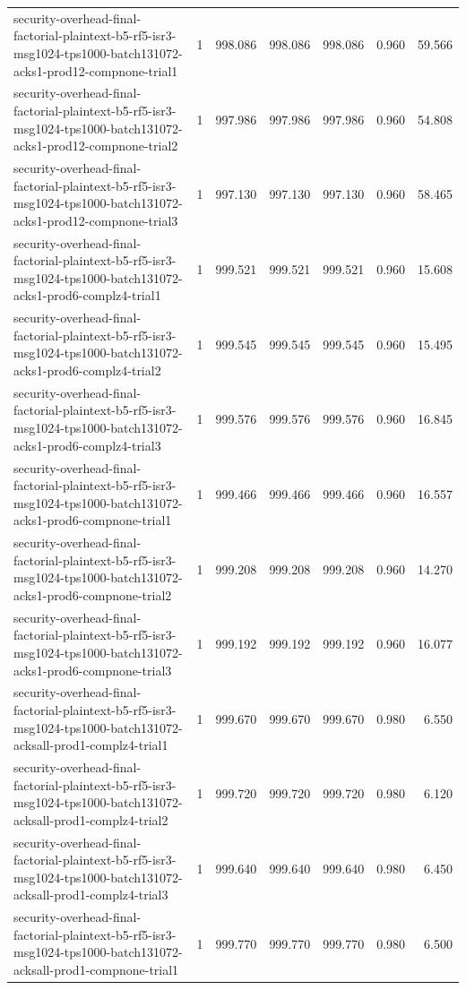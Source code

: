 \begin{tabular}{lrrrrrr}
security-overhead-final-factorial-plaintext-b5-rf5-isr3-msg1024-tps1000-batch131072-acks1-prod12-compnone-trial1 & 1 & 998.086 & 998.086 & 998.086 & 0.960 & 59.566 \\
security-overhead-final-factorial-plaintext-b5-rf5-isr3-msg1024-tps1000-batch131072-acks1-prod12-compnone-trial2 & 1 & 997.986 & 997.986 & 997.986 & 0.960 & 54.808 \\
security-overhead-final-factorial-plaintext-b5-rf5-isr3-msg1024-tps1000-batch131072-acks1-prod12-compnone-trial3 & 1 & 997.130 & 997.130 & 997.130 & 0.960 & 58.465 \\
security-overhead-final-factorial-plaintext-b5-rf5-isr3-msg1024-tps1000-batch131072-acks1-prod6-complz4-trial1 & 1 & 999.521 & 999.521 & 999.521 & 0.960 & 15.608 \\
security-overhead-final-factorial-plaintext-b5-rf5-isr3-msg1024-tps1000-batch131072-acks1-prod6-complz4-trial2 & 1 & 999.545 & 999.545 & 999.545 & 0.960 & 15.495 \\
security-overhead-final-factorial-plaintext-b5-rf5-isr3-msg1024-tps1000-batch131072-acks1-prod6-complz4-trial3 & 1 & 999.576 & 999.576 & 999.576 & 0.960 & 16.845 \\
security-overhead-final-factorial-plaintext-b5-rf5-isr3-msg1024-tps1000-batch131072-acks1-prod6-compnone-trial1 & 1 & 999.466 & 999.466 & 999.466 & 0.960 & 16.557 \\
security-overhead-final-factorial-plaintext-b5-rf5-isr3-msg1024-tps1000-batch131072-acks1-prod6-compnone-trial2 & 1 & 999.208 & 999.208 & 999.208 & 0.960 & 14.270 \\
security-overhead-final-factorial-plaintext-b5-rf5-isr3-msg1024-tps1000-batch131072-acks1-prod6-compnone-trial3 & 1 & 999.192 & 999.192 & 999.192 & 0.960 & 16.077 \\
security-overhead-final-factorial-plaintext-b5-rf5-isr3-msg1024-tps1000-batch131072-acksall-prod1-complz4-trial1 & 1 & 999.670 & 999.670 & 999.670 & 0.980 & 6.550 \\
security-overhead-final-factorial-plaintext-b5-rf5-isr3-msg1024-tps1000-batch131072-acksall-prod1-complz4-trial2 & 1 & 999.720 & 999.720 & 999.720 & 0.980 & 6.120 \\
security-overhead-final-factorial-plaintext-b5-rf5-isr3-msg1024-tps1000-batch131072-acksall-prod1-complz4-trial3 & 1 & 999.640 & 999.640 & 999.640 & 0.980 & 6.450 \\
security-overhead-final-factorial-plaintext-b5-rf5-isr3-msg1024-tps1000-batch131072-acksall-prod1-compnone-trial1 & 1 & 999.770 & 999.770 & 999.770 & 0.980 & 6.500 \\

\end{tabular}
